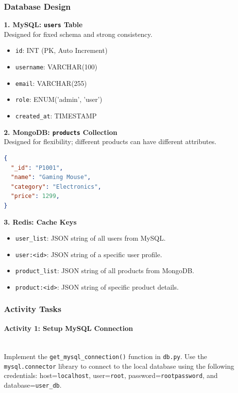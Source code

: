\subsubsection{Database Design}

\textbf{1. MySQL: \texttt{users} Table} \\
Designed for fixed schema and strong consistency.
\begin{itemize}
    \item \texttt{id}: INT (PK, Auto Increment)
    \item \texttt{username}: VARCHAR(100)
    \item \texttt{email}: VARCHAR(255)
    \item \texttt{role}: ENUM('admin', 'user')
    \item \texttt{created\_at}: TIMESTAMP
\end{itemize}

\textbf{2. MongoDB: \texttt{products} Collection} \\
Designed for flexibility; different products can have different attributes.
\begin{lstlisting}[language=json, basicstyle=\small\ttfamily]
{
  "_id": "P1001",
  "name": "Gaming Mouse",
  "category": "Electronics",
  "price": 1299,
}
\end{lstlisting}

\textbf{3. Redis: Cache Keys}
\begin{itemize}
    \item \texttt{user\_list}: JSON string of all users from MySQL.
    \item \texttt{user:<id>}: JSON string of a specific user profile.
    \item \texttt{product\_list}: JSON string of all products from MongoDB.
    \item \texttt{product:<id>}: JSON string of specific product details.
\end{itemize}

\subsubsection{Activity Tasks}

\paragraph{Activity 1: Setup MySQL Connection}~\\
Implement the \texttt{get\_mysql_connection()} function in \texttt{db.py}. Use the \texttt{mysql.connector} library to connect to the local database using the following credentials: host=\texttt{localhost}, user=\texttt{root}, password=\texttt{rootpassword}, and database=\texttt{user\_db}.

